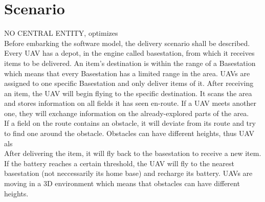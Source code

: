 \section{Scenario}
NO CENTRAL ENTITY, optimizes
\\
Before embarking the software model, the delivery scenario shall be described.  Every UAV has a depot, in the engine called basestation, from which it receives items to be delivered. An item's destination is within the range of a Basestation which means that every Basestation has a limited range in the area. UAVs are assigned to one specific Basestation and only deliver items of it. After receiving an item, the UAV will begin flying to the specific destination. It scans the area and stores information on all fields it has seen en-route. If a UAV meets another one, they will exchange information on the already-explored parts of the area.\\
If a field on the route contains an obstacle, it will deviate from its route and try to find one around the obstacle. Obstacles can have different heights, thus UAV als\\
After delivering the item, it will fly back to the basestation to receive a new item. If the battery reaches a certain threshold, the UAV will fly to the nearest basestation (not neccessarily its home base) and recharge its battery. 
 UAVs are moving in a 3D environment which means that obstacles can have different heights.


